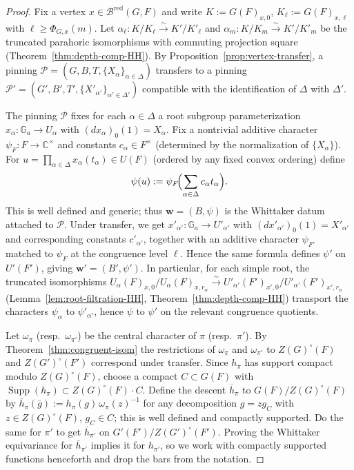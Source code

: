 \documentclass[american]{article}
\numberwithin{equation}{section}
\numberwithin{figure}{section}
\theoremstyle{plain}
\theoremstyle{definition}
\theoremstyle{remark}
\DeclareMathOperator{\Supp}{Supp}
\newcommand{\C}{\mathbb{C}}
\begin{document}
\begin{proof}

Fix a vertex \(x\in\mathcal{B}^{\mathrm{red}}(G,F)\) and write
\(K:=G(F)_{x,0}\), \(K_\ell:=G(F)_{x,\ell}\) with
\(\ell\ge \Phi_{G,x}(m)\). Let \(\alpha_\ell:K/K_\ell\xrightarrow{\sim}K'/K'_\ell\) and
\(\alpha_m:K/K_m\xrightarrow{\sim}K'/K'_m\) be the truncated parahoric
isomorphisms with commuting projection square (Theorem~\ref{thm:depth-comp-HH}).
By Proposition~\ref{prop:vertex-transfer}, a pinning
\(\mathcal P=(G,B,T,\{X_\alpha\}_{\alpha\in\Delta})\) transfers to a pinning
\(\mathcal P'=(G',B',T',\{X'_{\alpha'}\}_{\alpha'\in\Delta'})\) compatible with
the identification of \(\Delta\) with \(\Delta'\).

\smallskip

The pinning \(\mathcal P\) fixes for each \(\alpha\in\Delta\) a root subgroup
parameterization \(x_\alpha:\mathbb{G}_a\!\to U_\alpha\) with
\((dx_\alpha)_0(1)=X_\alpha\). Fix a nontrivial additive character
\(\psi_F:F\to\C^\times\) and constants \(c_\alpha\in F^\times\) (determined by the normalization of \(\{X_\alpha\}\)).
For \(u=\prod_{\alpha\in\Delta}x_\alpha(t_\alpha)\in U(F)\) (ordered by any
fixed convex ordering) define
\[
\psi(u):=\psi_F\!\Bigl(\sum_{\alpha\in\Delta} c_\alpha t_\alpha\Bigr).
\]
This is well defined and generic; thus \(\mathbf w=(B,\psi)\) is the
Whittaker datum attached to \(\mathcal P\). Under transfer,
we get \(x'_{\alpha'}:\mathbb{G}_a\!\to U'_{\alpha'}\) with
\((dx'_{\alpha'})_0(1)=X'_{\alpha'}\) and corresponding constants \(c'_{\alpha'}\),
together with an additive character \(\psi_{F'}\) matched to
\(\psi_F\) at the congruence level \(\ell\). Hence the same formula defines
\(\psi'\) on \(U'(F')\), giving \(\mathbf w'=(B',\psi')\).
In particular, for each simple root, the truncated isomorphisms
\(U_\alpha(F)_{x,0}/U_\alpha(F)_{x,r_\alpha}\!\xrightarrow{\sim}\!
U'_{\alpha'}(F')_{x',0}/U'_{\alpha'}(F')_{x',r_\alpha}\)
(Lemma~\ref{lem:root-filtration-HH}, Theorem~\ref{thm:depth-comp-HH})
transport the characters \(\psi_\alpha\) to \(\psi'_{\alpha'}\), hence \(\psi\) to \(\psi'\) on the relevant congruence quotients.

\smallskip

Let \(\omega_\pi\) (resp.\ \(\omega_{\pi'}\)) be the central character of \(\pi\)
(resp.\ \(\pi'\)). By Theorem~\ref{thm:congruent-isom} the restrictions of
\(\omega_\pi\) and \(\omega_{\pi'}\) to \(Z(G)^\circ(F)\) and
\(Z(G')^\circ(F')\) correspond under transfer. Since \(h_\pi\) has support
compact modulo \(Z(G)^\circ(F)\), choose a compact \(C\subset G(F)\) with
\(\Supp(h_\pi)\subset Z(G)^\circ(F)\!\cdot C\).
Define the descent \(\overline h_\pi\) to \(G(F)/Z(G)^\circ(F)\) by
\(\overline h_\pi(\overline g):=h_\pi(g)\,\omega_\pi(z)^{-1}\) for any
decomposition \(g=zg_C\) with \(z\in Z(G)^\circ(F)\), \(g_C\in C\);
this is well defined and compactly supported. Do the same for \(\pi'\) to get
\(\overline h_{\pi'}\) on \(G'(F')/Z(G')^\circ(F')\). Proving the Whittaker
equivariance for \(\overline h_{\pi'}\) implies it for \(h_{\pi'}\), so we work
with compactly supported functions henceforth and drop the bars from the
notation.


\end{proof}
\end{document}
